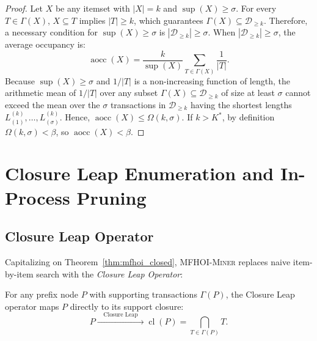 \documentclass[runningheads,orivec]{llncs}
\newcommand{\supp}{\operatorname{sup}}
\newcommand{\aocc}{\operatorname{aocc}}
\newcommand{\cl}{\operatorname{cl}}
\newcommand{\MFHOIMiner}{\textsc{MFHOI-Miner}}
\begin{document}
\begin{proof}
Let $X$ be any itemset with $|X| = k$ and $\supp(X) \ge \sigma$.
For every $T \in \Gamma(X)$, $X \subseteq T$ implies $|T| \ge k$, which guarantees $\Gamma(X) \subseteq \mathcal{D}_{\ge k}$.
Therefore, a necessary condition for $\supp(X) \ge \sigma$ is $|\mathcal{D}_{\ge k}| \ge \sigma$.
When $|\mathcal{D}_{\ge k}| \ge \sigma$, the average occupancy is:
\begin{equation*}
\aocc(X) = \frac{k}{\supp(X)} \sum_{T \in \Gamma(X)} \frac{1}{|T|}.
\end{equation*}
Because $\supp(X) \ge \sigma$ and $1/|T|$ is a non-increasing function of length, the arithmetic mean of $1/|T|$ over any subset $\Gamma(X) \subseteq \mathcal{D}_{\ge k}$ of size at least $\sigma$ cannot exceed the mean over the $\sigma$ transactions in $\mathcal{D}_{\ge k}$ having the shortest lengths $L_{(1)}^{(k)}, \dots, L_{(\sigma)}^{(k)}$.
Hence, $\aocc(X) \le \Omega(k, \sigma)$. If $k > K^*$, by definition $\Omega(k, \sigma) < \beta$, so $\aocc(X) < \beta$.
\end{proof}

\section{Closure Leap Enumeration and In-Process Pruning}
\label{sec:pruning}

\subsection{Closure Leap Operator}

Capitalizing on Theorem~\ref{thm:mfhoi_closed}, \MFHOIMiner{} replaces naive item-by-item search with the \emph{Closure Leap Operator}:
\begin{definition}
For any prefix node $P$ with supporting transactions $\Gamma(P)$, the Closure Leap operator maps $P$ directly to its support closure:
\begin{equation}
P \xrightarrow{\quad\text{Closure Leap}\quad} \cl(P) = \bigcap_{T \in \Gamma(P)} T.
\end{equation}
\end{definition}
\end{document}
